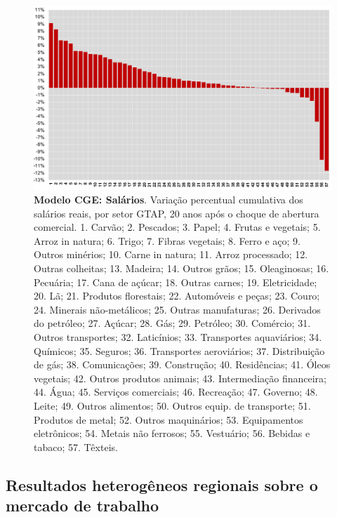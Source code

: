 \documentclass{article}
\begin{document}
\begin{landscape}
\begin{figure}[htbp]
    \centering
    \includegraphics[scale=0.8]{mod_estatico_sal.pdf}
    \caption[Modelo CGE: Salários]{\textbf{Modelo CGE: Salários}. Variação percentual cumulativa dos salários reais, por setor GTAP, 20 anos após o choque de abertura comercial. \scriptsize{1. Carvão; 2. Pescados; 3. Papel; 4. Frutas e vegetais; 5. Arroz in natura; 6. Trigo; 7. Fibras vegetais; 8. Ferro e aço; 9. Outros minérios; 10. Carne in natura; 11. Arroz processado; 12. Outras colheitas; 13. Madeira; 14. Outros grãos; 15. Oleaginosas; 16. Pecuária; 17. Cana de açúcar; 18. Outras carnes; 19. Eletricidade; 20. Lã; 21. Produtos florestais; 22. Automóveis e peças; 23. Couro; 24. Minerais não-metálicos; 25. Outras manufaturas; 26. Derivados do petróleo; 27. Açúcar; 28. Gás; 29. Petróleo; 30. Comércio; 31. Outros transportes; 32. Laticínios; 33. Transportes aquaviários; 34. Químicos; 35. Seguros; 36. Transportes aeroviários; 37. Distribuição de gás; 38. Comunicações; 39. Construção; 40. Residências; 41. Óleos vegetais; 42. Outros produtos animais; 43. Intermediação financeira; 44. Água; 45. Serviços comerciais; 46. Recreação; 47. Governo; 48. Leite; 49. Outros alimentos; 50. Outros equip. de transporte; 51. Produtos de metal; 52. Outros maquinários; 53. Equipamentos eletrônicos; 54. Metais não ferrosos; 55. Vestuário; 56. Bebidas e tabaco; 57. Têxteis.}}
    \label{fig:mod_estatico_sal}
\end{figure}
\end{landscape}
\newpage

\subsection{Resultados heterogêneos regionais sobre o mercado de trabalho}
\end{document}
